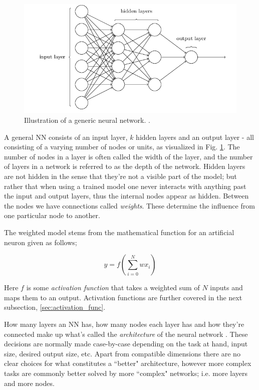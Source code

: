 \begin{figure}[H]
    \centering
    \includegraphics[width=1\linewidth]{project_2/figures/generic_NN.png}
    \caption{Illustration of a generic neural network. \cite[Taken from][Ch.1]{nielsen}.}
    \label{fig:NN}
\end{figure}

A general NN consists of an input layer, $k$ hidden layers and an output layer - all consisting of a varying number of nodes or units, as visualized in Fig. \ref{fig:NN}. The number of nodes in a layer is often called the width of the layer, and the number of layers in a network is referred to as the depth of the network. 
Hidden layers are not hidden in the sense that they're not a visible part of the model; but rather that when using a trained model one never interacts with anything past the input and output layers, thus the internal nodes appear as hidden. 
Between the nodes we have connections called \textit{weights}. These determine the influence from one particular node to another. 

The weighted model stems from the mathematical function for an artificial neuron given as follows; 

\begin{equation}\label{artifical_neuron}
    y = f\left( \sum_{i=0}^Nwx_i \right) 
\end{equation}

Here $f$ is some \textit{activation function} that takes a weighted sum of $N$ inputs and maps them to an output. Activation functions are further covered in the next subsection, \ref{sec:activation_func}.

How many layers an NN has, how many nodes each layer has and how they're connected make up what's called the \textit{architecture} of the neural network \citep[Ch.1]{nielsen}. These decisions are normally made case-by-case depending on the task at hand, input size, desired output size, etc. Apart from compatible dimensions there are no clear choices for what constitutes a ``better" architecture, however more complex tasks are commonly better solved by more ``complex" networks; i.e. more layers and more nodes. 

